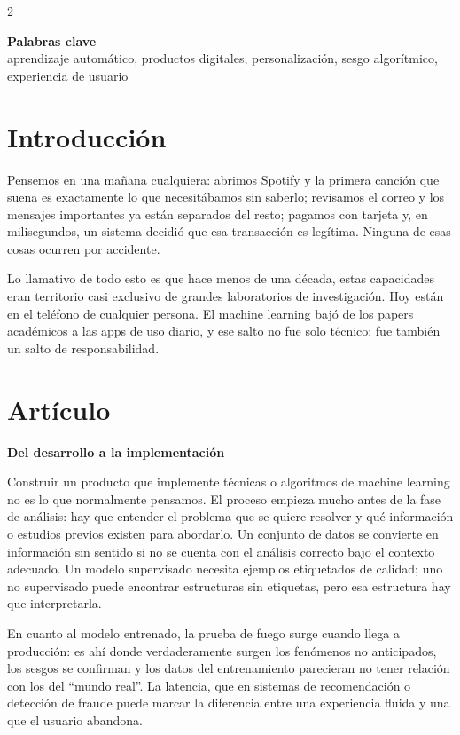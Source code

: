 \documentclass[10pt,spanish,Letterpaper,openany]{book}
\let\origtextbf\textbf
\renewcommand{\textbf}[1]{{\color{textlinetitle}\origtextbf{#1}}}
\begin{document}
\begin {multicols}{2}

\textbf{Palabras clave}\\
aprendizaje automático, productos digitales, personalización, sesgo algorítmico, experiencia de usuario

\section{Introducción}\label{introducciuxf3n-3}

Pensemos en una mañana cualquiera: abrimos Spotify y la primera canción que suena es exactamente lo que necesitábamos sin saberlo; revisamos el correo y los mensajes importantes ya están separados del resto; pagamos con tarjeta y, en milisegundos, un sistema decidió que esa transacción es legítima. Ninguna de esas cosas ocurren por accidente.

Lo llamativo de todo esto es que hace menos de una década, estas capacidades eran territorio casi exclusivo de grandes laboratorios de investigación. Hoy están en el teléfono de cualquier persona. El machine learning bajó de los papers académicos a las apps de uso diario, y ese salto no fue solo técnico: fue también un salto de responsabilidad.

\section{Artículo}\label{artuxedculo-2}

\textbf{Del desarrollo a la implementación}

Construir un producto que implemente técnicas o algoritmos de machine learning no es lo que normalmente pensamos. El proceso empieza mucho antes de la fase de análisis: hay que entender el problema que se quiere resolver y qué información o estudios previos existen para abordarlo. Un conjunto de datos se convierte en información sin sentido si no se cuenta con el análisis correcto bajo el contexto adecuado. Un modelo supervisado necesita ejemplos etiquetados de calidad; uno no supervisado puede encontrar estructuras sin etiquetas, pero esa estructura hay que interpretarla.

En cuanto al modelo entrenado, la prueba de fuego surge cuando llega a producción: es ahí donde verdaderamente surgen los fenómenos no anticipados, los sesgos se confirman y los datos del entrenamiento parecieran no tener relación con los del ``mundo real''. La latencia, que en sistemas de recomendación o detección de fraude puede marcar la diferencia entre una experiencia fluida y una que el usuario abandona.


\end{multicols}
\end{document}
